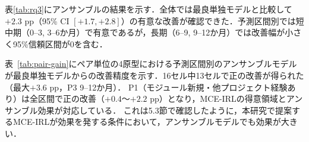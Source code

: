\documentclass[submit,noauthor,ses,dvipdfmx]{ipsj}
\newcommand{\todo}[1]{\colorbox{yellow}{{\bf TODO}:}{\color{red} {\textbf{[#1]}}}}
\begin{document}
表\ref{tab:rq3}にアンサンブルの結果を示す．全体では最良単独モデルと比較して$+2.3$ pp（95\% CI $[+1.7, +2.8]$）の有意な改善が確認できた．予測区間別では短中期（0--3, 3--6か月）で有意であるが，長期（6--9, 9--12か月）では改善幅が小さく95\%信頼区間が0を含む．

表~\ref{tab:pair-gain}にペア単位の4原型における予測区間別のアンサンブルモデルが最良単独モデルからの改善精度を示す．16セル中13セルで正の改善が得られた（最大$+3.6$ pp，P3 9--12か月）．
P1（モジュール新規・他プロジェクト経験あり）は全区間で正の改善（$+0.4$〜$+2.2$ pp）となり，MCE-IRLの得意領域とアンサンブル効果が対応している．
これは5.3節で確認したように，本研究で提案するMCE-IRLが効果を発する条件において，アンサンブルモデルでも効果が大きい．



\end{document}
